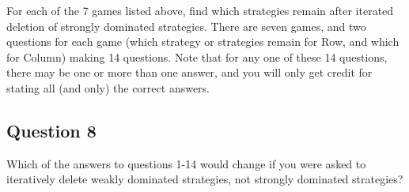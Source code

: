 \documentclass[
  11pt,
  twocolumn]{article}
\begin{document}
For each of the 7 games listed above, find which strategies remain after
iterated deletion of strongly dominated strategies. There are seven
games, and two questions for each game (which strategy or strategies
remain for Row, and which for Column) making 14 questions. Note that for
any one of these 14 questions, there may be one or more than one answer,
and you will only get credit for stating all (and only) the correct
answers.

\hypertarget{question-8}{%
\subsection{Question 8}\label{question-8}}

Which of the answers to questions 1-14 would change if you were asked to
iteratively delete weakly dominated strategies, not strongly dominated
strategies?
\end{document}
